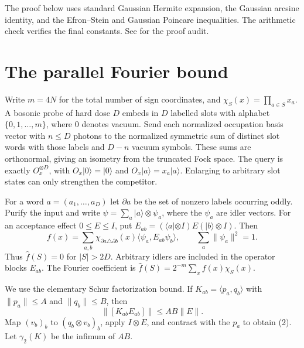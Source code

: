 \documentclass[11pt]{article}
\newcommand{\wh}{\widehat}
\begin{document}
The proof below uses standard Gaussian Hermite expansion, the Gaussian
arcsine identity, and the Efron--Stein and Gaussian Poincare inequalities.
The arithmetic check  verifies the final
constants. See  for the proof audit.

\section{The parallel Fourier bound}
Write $m=4N$ for the total number of sign coordinates, and
$\chi_S(x)=\prod_{a\in S}x_a$.
A bosonic probe of hard dose $D$ embeds in $D$ labelled slots with alphabet
$\{0,1,\ldots,m\}$, where $0$ denotes vacuum. Send each normalized
occupation basis vector with $n\le D$ photons to the normalized symmetric
sum of distinct slot words with those labels and $D-n$ vacuum symbols.
These sums are orthonormal, giving an isometry from the truncated Fock
space. The query is exactly $O_x^{\otimes D}$, with
$O_x|0\rangle=|0\rangle$ and $O_x|a\rangle=x_a|a\rangle$.
Enlarging to arbitrary slot states can only strengthen the competitor.

For a word $a=(a_1,\ldots,a_D)$ let $\partial a$ be the set of nonzero
labels occurring oddly. Purify the input and write
$\psi=\sum_a|a\rangle\otimes\psi_a$, where the $\psi_a$ are idler vectors.
For an acceptance effect $0\le E\le I$, put
$E_{ab}=(\langle a|\otimes I)E(|b\rangle\otimes I)$. Then
\[
 f(x)=\sum_{a,b}\chi_{\partial a\triangle\partial b}(x)
                  \langle\psi_a,E_{ab}\psi_b\rangle,
 \qquad \sum_a\|\psi_a\|^2=1.
 \tag{1}
\]
Thus $\wh f(S)=0$ for $|S|>2D$. Arbitrary idlers are included in the
operator blocks $E_{ab}$. The Fourier coefficient is
$\wh f(S)=2^{-m}\sum_x f(x)\chi_S(x)$.

We use the elementary Schur factorization bound. If
$K_{ab}=\langle p_a,q_b\rangle$ with $\|p_a\|\le A$ and $\|q_b\|\le B$,
then
\[
 \|[K_{ab}E_{ab}]\|\le AB\|E\|.
 \tag{2}
\]
Map $(v_b)_b$ to $(q_b\otimes v_b)_b$, apply $I\otimes E$, and contract
with the $p_a$ to obtain (2). Let $\gamma_2(K)$ be the infimum of $AB$.
\end{document}
